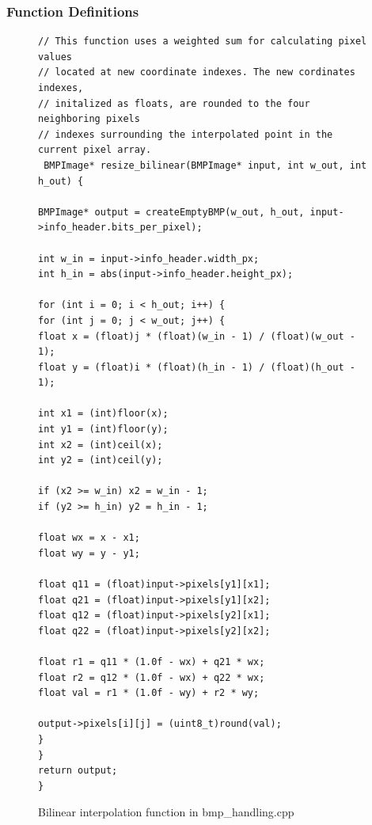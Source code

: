 \documentclass[11pt]{article}
\begin{document}
\subsubsection{Function Definitions}


\begin{figure}[H]
\begin{verbatim}
// This function uses a weighted sum for calculating pixel values
// located at new coordinate indexes. The new cordinates indexes,
// initalized as floats, are rounded to the four neighboring pixels
// indexes surrounding the interpolated point in the current pixel array.
 BMPImage* resize_bilinear(BMPImage* input, int w_out, int h_out) {

BMPImage* output = createEmptyBMP(w_out, h_out, input->info_header.bits_per_pixel);

int w_in = input->info_header.width_px;
int h_in = abs(input->info_header.height_px);

for (int i = 0; i < h_out; i++) {
for (int j = 0; j < w_out; j++) {
float x = (float)j * (float)(w_in - 1) / (float)(w_out - 1);
float y = (float)i * (float)(h_in - 1) / (float)(h_out - 1);

int x1 = (int)floor(x);
int y1 = (int)floor(y);
int x2 = (int)ceil(x);
int y2 = (int)ceil(y);

if (x2 >= w_in) x2 = w_in - 1;
if (y2 >= h_in) y2 = h_in - 1;

float wx = x - x1;
float wy = y - y1;

float q11 = (float)input->pixels[y1][x1];
float q21 = (float)input->pixels[y1][x2];
float q12 = (float)input->pixels[y2][x1];
float q22 = (float)input->pixels[y2][x2];

float r1 = q11 * (1.0f - wx) + q21 * wx;
float r2 = q12 * (1.0f - wx) + q22 * wx;
float val = r1 * (1.0f - wy) + r2 * wy;

output->pixels[i][j] = (uint8_t)round(val);
}
}
return output;
}
\end{verbatim}

\caption{Bilinear interpolation function in bmp\_handling.cpp}
\label{figure:Bilinear}
\end{figure}
\end{document}
